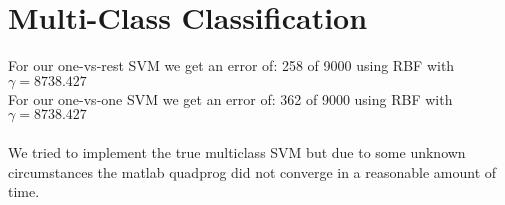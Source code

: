 
\section*{Multi-Class Classification} 
For our one-vs-rest SVM we get an error of: 258 of 9000
using RBF with $\gamma = 8738.427$\\
For our one-vs-one SVM we get an error of: 362 of 9000
using RBF with $\gamma = 8738.427$\\
\\
We tried to implement the true multiclass SVM but due to some unknown circumstances the matlab quadprog did not converge in a reasonable amount of time.